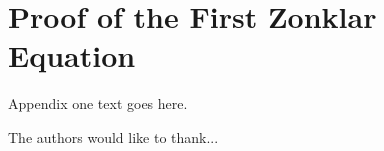 \documentclass[journal]{IEEEtran}
\begin{document}

%
  

\appendices
\section{Proof of the First Zonklar Equation}
Appendix one text goes here.



The authors would like to thank...


\ifCLASSOPTIONcaptionsoff
  \newpage
\fi






{}

\end{document}
